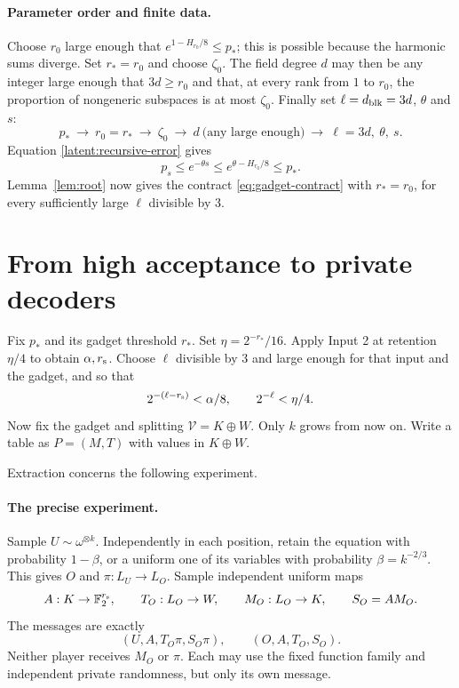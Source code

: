 \documentclass[11pt]{article}
\newcommand{\F}{\mathbb F}
\begin{document}
\paragraph{Parameter order and finite data.}
Choose $r_0$ large enough that $e^{1-H_{r_0}/8}\le p_*$; this is
possible because the harmonic sums diverge. Set $r_*=r_0$ and choose
$\zeta_0$. The field degree $d$ may then be any integer large enough that
$3d\ge r_0$ and that, at every rank from $1$ to $r_0$, the proportion of
nongeneric subspaces is at most $\zeta_0$. Finally set $\ell=d_{\rm blk}=3d$,
$\theta$ and $s$:
\[
 p_*\ \longrightarrow\ r_0=r_*\ \longrightarrow\ \zeta_0\
 \longrightarrow\ d\ \text{(any large enough)}\ \longrightarrow\ \ell=3d,\ \theta,\ s.
\]
Equation \eqref{latent:recursive-error} gives
\[
 p_s\le e^{-\theta s}\le e^{\theta-H_{r_0}/8}\le p_*.
\]
Lemma~\ref{lem:root} now gives the contract
\eqref{eq:gadget-contract} with $r_*=r_0$, for every sufficiently large
$\ell$ divisible by $3$.


\section{From high acceptance to private decoders}\label{sec:decoders}

Fix $p_*$ and its gadget threshold $r_*$. Set $\eta=2^{-r_*}/16$.
Apply Input 2 at retention $\eta/4$ to obtain $\alpha,r_{\rm s}$. Choose
$\ell$ divisible by $3$ and large enough for that input and the gadget, and so that
\begin{equation}\label{eq:matrix-parameters}
 2^{-(\ell-r_{\rm s})}<\alpha/8,\qquad 2^{-\ell}<\eta/4.
\end{equation}
Now fix the gadget and splitting $\mathcal V=K\oplus W$. Only $k$ grows
from now on. Write a table as $P=(M,T)$ with values in $K\oplus W$.

Extraction concerns the following experiment.

\paragraph{The precise experiment.}
Sample $U\sim\omega^{\otimes k}$. Independently in each position, retain
the equation with probability $1-\beta$, or a uniform one of its variables
with probability $\beta=k^{-2/3}$. This gives $O$ and $\pi:L_U\to L_O$.
Sample independent uniform maps
\[
 A:K\to\F_2^{r_{\rm s}},\qquad T_O:L_O\to W,\qquad M_O:L_O\to K,
 \qquad S_O=AM_O.
\]
The messages are exactly
\begin{equation}\label{eq:messages}
 (U,A,T_O\pi,S_O\pi),\qquad (O,A,T_O,S_O).
\end{equation}
Neither player receives $M_O$ or $\pi$. Each may use the fixed function
family and independent private randomness, but only its own message.
\end{document}
